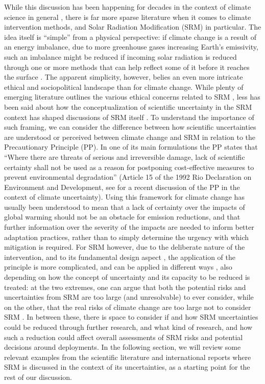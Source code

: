 \documentclass[acp, manuscript]{copernicus}
\begin{document}
While this discussion has been happening for decades in the context of climate science in general \citep{Oreskes2004}, there is far more sparse literature when it comes to climate intervention methods, and Solar Radiation Modification (SRM) in particular. The idea itself is ``simple'' from a physical perspective: if climate change is a result of an energy imbalance, due to more greenhouse gases increasing Earth’s emissivity, such an imbalance might be reduced if incoming solar radiation is reduced through one or more methods that can help reflect some of it before it reaches the surface \citep{Budyko1977,Govin2003}. The apparent simplicity, however, belies an even more intricate ethical and sociopolitical landscape than for climate change. While plenty of emerging literature outlines the various ethical concerns related to SRM \citep[for a recent review, see][]{Flegal2019}, less has been said about how the conceptualization of scientific uncertainty in the SRM context has shaped discussions of SRM itself \citep[an exception being][]{Wiertz2016}.  To understand the importance of such framing, we can consider the difference between how scientific uncertainties are understood or perceived between climate change and SRM in relation to the Precautionary Principle (PP).  In one of its main formulations the PP states that ``Where there are threats of serious and irreversible damage, lack of scientific certainty shall not be used as a reason for postponing cost-effective measures to prevent environmental degradation'' (Article 15 of the 1992 Rio Declaration on Environment and Development, see \cite{Hopster2023} for a recent discussion of the PP in the context of climate uncertainty). Using this framework for climate change has usually been understood to mean that a lack of certainty over the impacts of global warming should not be an obstacle for emission reductions, and that further information over the severity of the impacts are needed to inform better adaptation practices, rather than to simply determine the urgency with which mitigation is required. For SRM however, due to the deliberate nature of the intervention, and to its fundamental design aspect \citep{Kravitz2016}, the application of the principle is more complicated, and can be applied in different ways \citep{Tedsen2013,Davies_Vinders_2025}, also depending on how the concept of uncertainty and its capacity to be reduced is treated: at the two extremes, one can argue that both the potential risks and uncertainties from SRM are too large (and unresolvable) to ever consider, while on the other, that the real risks of climate change are too large not to consider SRM \citep{Baiman2024}. In between these, there is space to consider if and how SRM uncertainties could be reduced through further research, and what kind of research, and how such a reduction could affect overall assessments of SRM risks and potential decisions around deployments.
In the following section, we will review some relevant examples from the scientific literature and international reports where SRM is discussed in the context of its uncertainties, as a starting point for the rest of our discussion.\\
\end{document}
